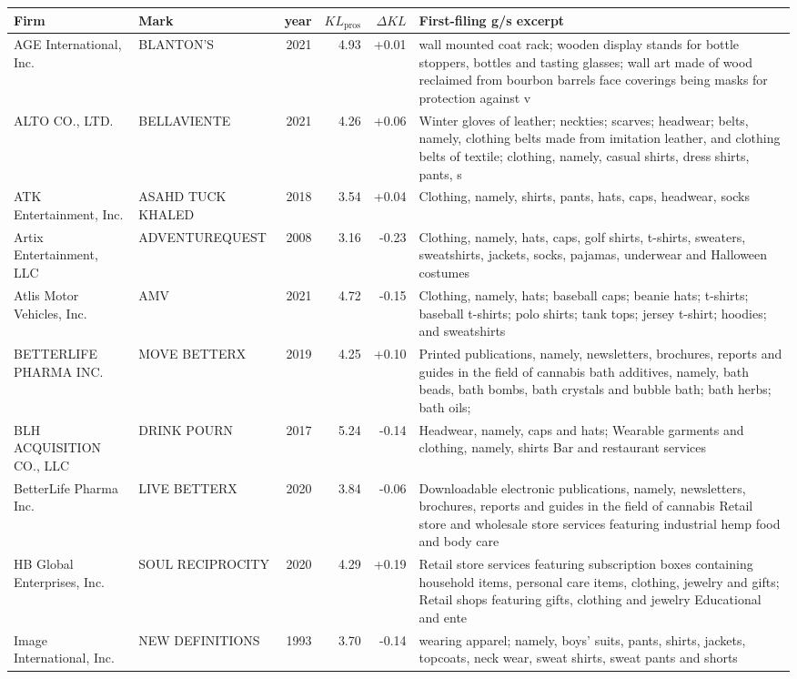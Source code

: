 \begin{tabular}{p{4.0cm}p{2.2cm}rrrp{6.5cm}}
\toprule
Firm & Mark & year & $KL_\text{pros}$ & $\Delta KL$ & First-filing g/s excerpt \\
\midrule
AGE International, Inc. & BLANTON'S & 2021 & 4.93 & +0.01 & wall mounted coat rack; wooden display stands for bottle stoppers, bottles and tasting glasses; wall art made of wood reclaimed from bourbon barrels face coverings being masks for protection against v \\
ALTO CO., LTD. & BELLAVIENTE & 2021 & 4.26 & +0.06 & Winter gloves of leather; neckties; scarves; headwear; belts, namely, clothing belts made from imitation leather, and clothing belts of textile; clothing, namely, casual shirts, dress shirts, pants, s \\
ATK Entertainment, Inc. & ASAHD TUCK KHALED & 2018 & 3.54 & +0.04 & Clothing, namely, shirts, pants, hats, caps, headwear, socks \\
Artix Entertainment, LLC & ADVENTUREQUEST & 2008 & 3.16 & -0.23 & Clothing, namely, hats, caps, golf shirts, t-shirts, sweaters, sweatshirts, jackets, socks, pajamas, underwear and Halloween costumes \\
Atlis Motor Vehicles, Inc. & AMV & 2021 & 4.72 & -0.15 & Clothing, namely, hats; baseball caps; beanie hats; t-shirts; baseball t-shirts; polo shirts; tank tops; jersey t-shirt; hoodies; and sweatshirts \\
BETTERLIFE PHARMA INC. & MOVE BETTERX & 2019 & 4.25 & +0.10 & Printed publications, namely, newsletters, brochures, reports and guides in the field of cannabis bath additives, namely, bath beads, bath bombs, bath crystals and bubble bath; bath herbs; bath oils;  \\
BLH ACQUISITION CO., LLC & DRINK POURN & 2017 & 5.24 & -0.14 & Headwear, namely, caps and hats; Wearable garments and clothing, namely, shirts Bar and restaurant services \\
BetterLife Pharma Inc. & LIVE BETTERX & 2020 & 3.84 & -0.06 & Downloadable electronic publications, namely, newsletters, brochures, reports and guides in the field of cannabis Retail store and wholesale store services featuring industrial hemp food and body care \\
HB Global Enterprises, Inc. & SOUL RECIPROCITY & 2020 & 4.29 & +0.19 & Retail store services featuring subscription boxes containing household items, personal care items, clothing, jewelry and gifts; Retail shops featuring gifts, clothing and jewelry Educational and ente \\
Image International, Inc. & NEW DEFINITIONS & 1993 & 3.70 & -0.14 & wearing apparel; namely, boys' suits, pants, shirts, jackets, topcoats, neck wear, sweat shirts, sweat pants and shorts \\
\bottomrule
\end{tabular}
\clearpage


